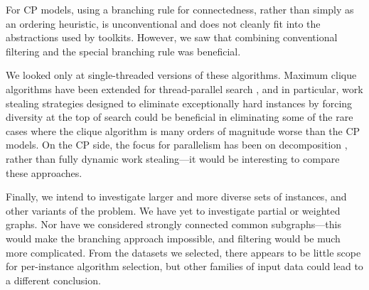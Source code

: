 \documentclass{llncs}
\begin{document}
For CP models, using a branching rule for connectedness, rather than simply as an ordering heuristic,
is unconventional and does not cleanly fit into the abstractions used by toolkits. However, we saw
that combining conventional filtering and the special branching rule was beneficial.

We looked only at single-threaded versions of these algorithms. Maximum clique algorithms have been
extended for thread-parallel search
\cite{DBLP:journals/algorithms/McCreeshP13,DBLP:journals/jcisd/DepolliKRTJ13,DBLP:journals/cor/SegundoLP16},
and in particular, work stealing strategies designed to eliminate exceptionally hard instances by
forcing diversity at the top of search \cite{DBLP:journals/topc/McCreeshP15} could be beneficial in
eliminating some of the rare cases where the clique algorithm is many orders of magnitude worse than
the CP models. On the CP side, the focus for parallelism has been on decomposition
\cite{DBLP:conf/ictai/MinotNS15}, rather than fully dynamic work stealing---it would be interesting
to compare these approaches.

Finally, we intend to investigate larger and more diverse sets of instances, and other variants of
the problem. We have yet to investigate partial or weighted graphs. Nor have we considered strongly
connected common subgraphs---this would make the branching approach impossible, and filtering would
be much more complicated. From the datasets we selected, there appears to be little scope for
per-instance algorithm selection, but other families of input data could lead to a different
conclusion.

\citesforrefcheck



\end{document}
